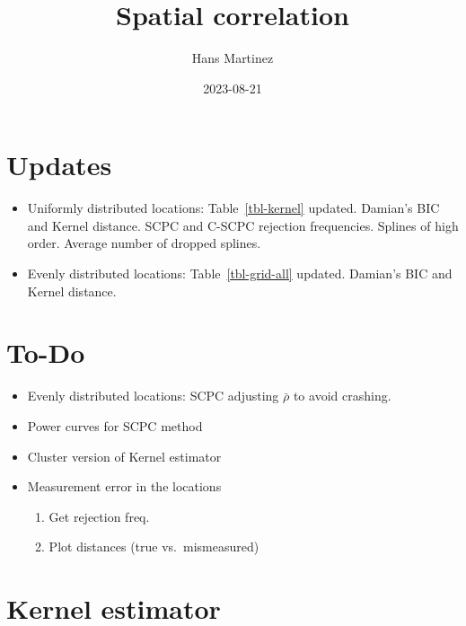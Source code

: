 \documentclass[
]{article}
\title{Spatial correlation}
\author{Hans Martinez}
\date{2023-08-21}
\providecommand{\tightlist}{%
  \setlength{\itemsep}{0pt}\setlength{\parskip}{0pt}}\usepackage{longtable,booktabs,array}
\begin{document}
\maketitle
\ifdefined\Shaded\renewenvironment{Shaded}{\begin{tcolorbox}[sharp corners, interior hidden, frame hidden, borderline west={3pt}{0pt}{shadecolor}, breakable, boxrule=0pt, enhanced]}{\end{tcolorbox}}\fi

\hypertarget{updates}{%
\section*{Updates}\label{updates}}

\begin{itemize}
\tightlist
\item
  Uniformly distributed locations: Table~\ref{tbl-kernel} updated.
  Damian's BIC and Kernel distance. SCPC and C-SCPC rejection
  frequencies. Splines of high order. Average number of dropped splines.
\item
  Evenly distributed locations: Table~\ref{tbl-grid-all} updated.
  Damian's BIC and Kernel distance.
\end{itemize}

\hypertarget{to-do}{%
\section*{To-Do}\label{to-do}}

\begin{itemize}
\tightlist
\item
  Evenly distributed locations: SCPC adjusting \(\bar\rho\) to avoid
  crashing.
\item
  Power curves for SCPC method
\item
  Cluster version of Kernel estimator
\item
  Measurement error in the locations

  \begin{enumerate}
  \def\labelenumi{\alph{enumi}.}
  \tightlist
  \item
    Get rejection freq.
  \item
    Plot distances (true vs.~mismeasured)
  \end{enumerate}
\end{itemize}

\hypertarget{sec-kernel}{%
\section{Kernel estimator}\label{sec-kernel}}
\end{document}
